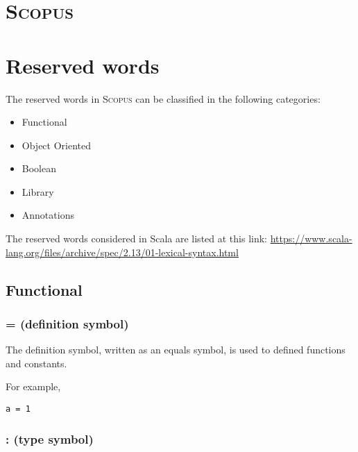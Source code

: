 \documentclass[12pt,a4paper]{article}
\newcommand{\Scopus}{\textsc{Scopus}\xspace}
\begin{document}


    \section{\Scopus}


    \section{Reserved words}

    The reserved words in \Scopus can be classified in the following categories:

    \begin{itemize}
        \item Functional
        \item Object Oriented
        \item Boolean
        \item Library
        \item Annotations
    \end{itemize}


    The reserved words considered in Scala are listed at this link:
    \url{https://www.scala-lang.org/files/archive/spec/2.13/01-lexical-syntax.html}

    \subsection{Functional}

    \subsubsection{= (definition symbol)}

    The definition symbol, written as an equals symbol, is used to defined functions and constants.

    For example,
    \begin{lstlisting}[label={lst:exampleDef}]
  a = 1
    \end{lstlisting}

    \subsubsection{: (type symbol)}
\end{document}
